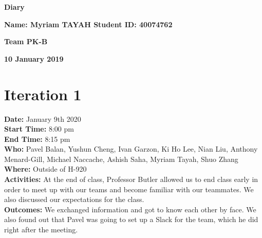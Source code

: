 \documentclass[12pt]{article}
\begin{document}
\vspace*{0.2in}
\centerline{\bf\Large Diary}

\vspace*{0.2in}
\centerline{\bf\Large Name: Myriam TAYAH  Student ID: 40074762}

\vspace*{0.2in}
\centerline{\bf\Large Team PK-B}

\vspace*{0.2in}
\centerline{\bf\Large 10 January 2019}

\section{Iteration 1}

{\bf Date:} January 9th 2020\\
{\bf Start Time:} 8:00 pm\\
{\bf End Time:} 8:15 pm \\
{\bf Who:} Pavel Balan, Yushun Cheng, Ivan Garzon, Ki Ho Lee, Nian Liu, Anthony Menard-Gill, Michael Naccache, Ashish Saha, Myriam Tayah, Shuo Zhang\\
{\bf Where:} Outside of H-920 \\
{\bf Activities:} At the end of class, Professor Butler allowed us to end class early in order to meet up with our teams and become familiar with our teammates. We also discussed our expectations for the class.\\
{\bf Outcomes:} We exchanged information and got to know each other by face. We also found out that Pavel was going to set up a Slack for the team, which he did right after the meeting. \\
\end{document}
